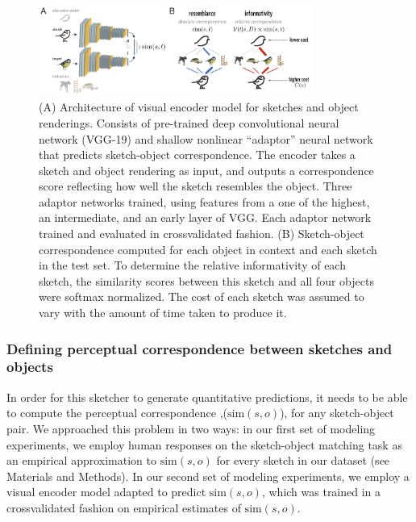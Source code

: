 \documentclass[9pt,twocolumn,twoside]{pnas-new}
\begin{document}
\begin{figure}[htbp]
\centering
\includegraphics[width=0.8\textwidth]{figures/4_model_schematic.pdf}
\caption{(A) Architecture of visual encoder model for sketches and object renderings. Consists of pre-trained deep convolutional neural network (VGG-19) and shallow nonlinear ``adaptor'' neural network that predicts sketch-object correspondence. 
The encoder takes a sketch and object rendering as input, and outputs a correspondence score reflecting how well the sketch resembles the object. 
Three adaptor networks trained, using features from a one of the highest, an intermediate, and an early layer of VGG.
Each adaptor network trained and evaluated in crossvalidated fashion. 
(B) Sketch-object correspondence computed for each object in context and each sketch in the test set. 
To determine the relative informativity of each sketch, the similarity scores between this sketch and all four objects were softmax normalized. 
The cost of each sketch was assumed to vary with the amount of time taken to produce it.}
\label{model_schematic}
\end{figure}

\subsubsection*{Defining perceptual correspondence between sketches and objects}

In order for this sketcher to generate quantitative predictions, it needs to be able to compute the perceptual correspondence ,($\textrm{sim}(s,o)$), for any sketch-object pair. 
We approached this problem in two ways: in our first set of modeling experiments, we employ human responses on the sketch-object matching task as an empirical approximation to $\textrm{sim}(s,o)$ for every sketch in our dataset (see Materials and Methods). 
In our second set of modeling experiments, we employ a visual encoder model adapted to predict $\textrm{sim}(s,o)$, which was trained in a crossvalidated fashion on empirical estimates of $\textrm{sim}(s,o)$.
\end{document}
